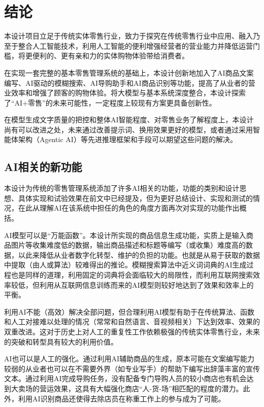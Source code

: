 
\section{结论}

本设计项目立足于传统实体零售行业，致力于探究在传统零售行业中应用、融入乃至于整合人工智能技术，利用人工智能的便利增强经营者的营业能力并降低运营门槛，将更便利的、更有亲和力的实体购物体验带给消费者。

在实现一套完整的基本零售管理系统的基础上，本设计创新地加入了AI商品文案编写、AI驱动的模糊搜索、AI导购助手和AI商品识别等功能，提高了从业者的营业效率和增强了顾客的购物体验。将大模型与基本系统深度整合，本设计探索了“AI+零售”的未来可能性，一定程度上较现有方案更具备创新性。

在模型生成文字质量的把控和整体AI智能程度、对零售业务了解程度上，本设计尚有可以改进之处，未来通过改善提示词、换用效果更好的模型，或者通过采用智能体架构（Agentic AI）等先进推理框架和手段可以期望这些问题的解决。

\subsection{AI相关的新功能}

本设计为传统的零售管理系统添加了许多AI相关的功能，功能的类别和设计思想、具体实现和试验效果在前文中已经提及，但为更好总结设计、实现和测试的情况，在此从理解AI在该系统中担任的角色的角度方面再次对实现的功能作出概括。

AI模型可以是“万能函数”。本设计所实现的商品信息生成功能，实质上是输入商品图片等收集难度低的数据，输出商品描述和标题等编写（或收集）难度高的数据，以此来降低从业者数字化转型、维护的负担的功能。也就是从易于获取的数据中提取（由人或算法）较难得出的推论。模糊搜索算法中近义词词典的AI生成过程也是同样的道理，利用固定的词典将会面临较大的局限性，而利用互联网搜索效率较低，但利用从互联网信息训练而来的AI模型则较好地达到了效果和效率上的平衡。

利用AI不能（高效）解决全部问题，但合理利用AI模型有助于在传统算法、函数和人工对接难以处理的情况（常常和自然语言、音视频相关）下达到效率、效果的双重改进。这对于历史上对人工的重复性工作依赖极强的传统实体零售行业，未来的突破和转型具有较大的利用价值。

AI也可以是人工的强化。通过利用AI辅助商品的生成，原本可能在文案编写能力较弱的从业者也可以在不需要外界（如专业写手）的帮助下编写出辞藻丰富的宣传文本。通过利用AI完成导购任务，没有配备专门导购人员的较小商店也有机会达到大卖场的营运效果，这具有大幅强化商店“人-货-场”相匹配的程度的潜力。此外，利用AI识别商品还使得去除店员在称重工作上的参与成为了可能。

